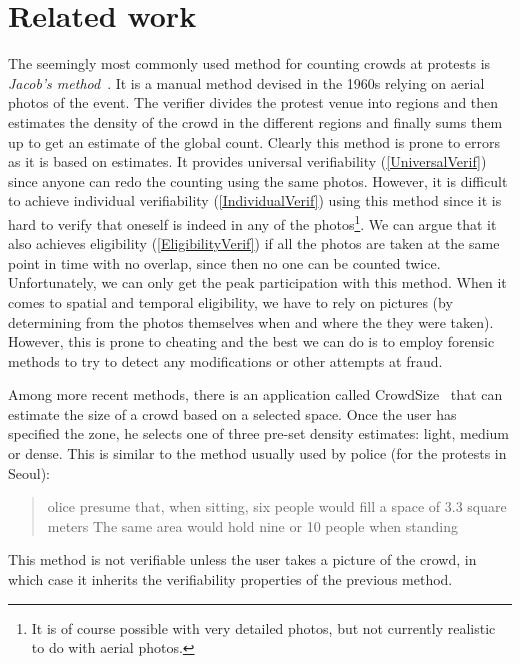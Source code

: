 \section{Related work}%
\label{RelatedWork}

The seemingly most commonly used method for counting crowds at protests is \emph{Jacob's method}~\cite[c.f.][]{%
  2016DemonstrationsInSeoul,%
  BBCHowToCountProtestNumbers,%
  HowWillWeKnowTrumpInauguralCrowdSize,%
  TheXManMarch,%
  TheCrowdNumbersGame,%
}.
It is a manual method devised in the 1960s relying on aerial photos of the event.
The verifier divides the protest venue into regions and then estimates the density of the crowd in the different regions and finally sums them up to get an estimate of the global count.
Clearly this method is prone to errors as it is based on estimates.
It provides universal verifiability (\cref{UniversalVerif}) since anyone can redo the counting using the same photos.
However, it is difficult to achieve individual verifiability (\cref{IndividualVerif}) using this method since it is hard to verify that oneself is indeed in any of the photos\footnote{It is of course possible with very detailed photos, but not currently realistic to do with aerial photos.}.
We can argue that it also achieves eligibility (\cref{EligibilityVerif}) if all the photos are taken at the same point in time with no overlap, since then no one can be counted twice.
Unfortunately, we can only get the peak participation with this method.
When it comes to spatial and temporal eligibility, we have to rely on pictures (\eg by determining from the photos themselves when and where the they were taken).
However, this is prone to cheating and the best we can do is to employ forensic methods to try to detect any modifications or other attempts at fraud.

Among more recent methods, there is an application called CrowdSize~\cite{CrowdSize} that can estimate the size of a crowd 
based on a selected space.
Once the user has specified the zone, he selects one of three pre-set density estimates: light, medium or dense.
This is similar to the method usually used by police (\eg for the protests in Seoul):
\blockcquote{2016DemonstrationsInSeoul}{%
  olice presume that, when sitting, six people would 
  fill a space of 
  3.3 square meters
  \textelp{}
  The same area would hold nine or 10 people when standing%
}.
This method is not verifiable unless the user takes a picture of the crowd, in which case it inherits the verifiability properties of the previous method.


